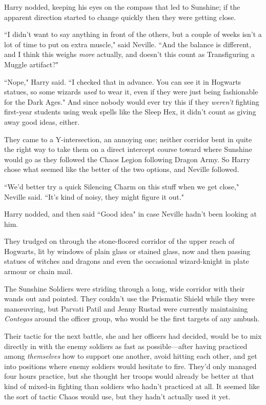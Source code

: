 Harry nodded, keeping his eyes on the compass that led to Sunshine; if the apparent direction started to change quickly then they were getting close.

``I didn't want to say anything in front of the others, but a couple of weeks isn't a lot of time to put on extra muscle," said Neville. ``And the balance is different, and I think this weighs \emph{more} actually, and doesn't this count as Transfiguring a Muggle artifact?"

``Nope," Harry said. ``I checked that in advance. You can see it in Hogwarts statues, so some wizards \emph{used} to wear it, even if they were just being fashionable for the Dark Ages." And since nobody would ever try this if they \emph{weren't} fighting first-year students using weak spells like the Sleep Hex, it didn't count as giving away good ideas, either.

They came to a Y-intersection, an annoying one; neither corridor bent in quite the right way to take them on a direct intercept course toward where Sunshine would go as they followed the Chaos Legion following Dragon Army. So Harry chose what seemed like the better of the two options, and Neville followed.

``We'd better try a quick Silencing Charm on this stuff when we get close," Neville said. ``It's kind of noisy, they might figure it out."

Harry nodded, and then said ``Good idea" in case Neville hadn't been looking at him.

They trudged on through the stone-floored corridor of the upper reach of Hogwarts, lit by windows of plain glass or stained glass, now and then passing statues of witches and dragons and even the occasional wizard-knight in plate armour or chain mail.

\later

The Sunshine Soldiers were striding through a long, wide corridor with their wands out and pointed. They couldn't use the Prismatic Shield while they were manœuvring, but Parvati Patil and Jenny Rustad were currently maintaining \emph{Contegos} around the officer group, who would be the first targets of any ambush.

Their tactic for the next battle, she and her officers had decided, would be to mix directly in with the enemy soldiers as fast as possible—after having practiced among \emph{themselves} how to support one another, avoid hitting each other, and get into positions where enemy soldiers would hesitate to fire. They'd only managed four hours practice, but she thought her troops would already be better at that kind of mixed-in fighting than soldiers who hadn't practiced at all. It seemed like the sort of tactic Chaos would use, but they hadn't actually used it yet.

